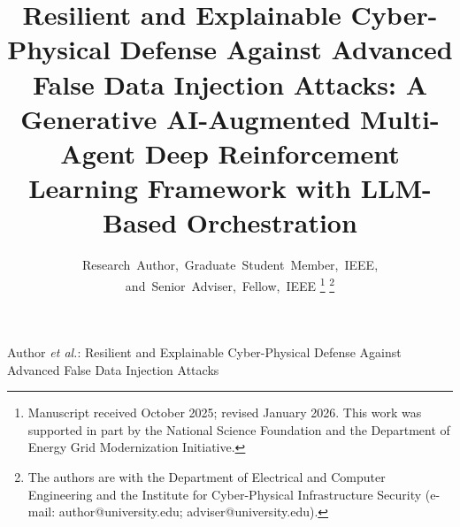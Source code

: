\documentclass[journal,compsoc]{IEEEtran}
\begin{document}
\title{Resilient and Explainable Cyber-Physical Defense Against Advanced False Data Injection Attacks: A Generative AI-Augmented Multi-Agent Deep Reinforcement Learning Framework with LLM-Based Orchestration}

\author{Research~Author,~Graduate~Student~Member,~IEEE,
        and~Senior~Adviser,~Fellow,~IEEE%
\thanks{Manuscript received October 2025; revised January 2026. This work was supported in part by the National Science Foundation and the Department of Energy Grid Modernization Initiative.}%
\thanks{The authors are with the Department of Electrical and Computer Engineering and the Institute for Cyber-Physical Infrastructure Security (e-mail: author@university.edu; adviser@university.edu).}}

%
{Author \MakeLowercase{\textit{et al.}}: Resilient and Explainable Cyber-Physical Defense Against Advanced False Data Injection Attacks}

\maketitle
\end{document}
